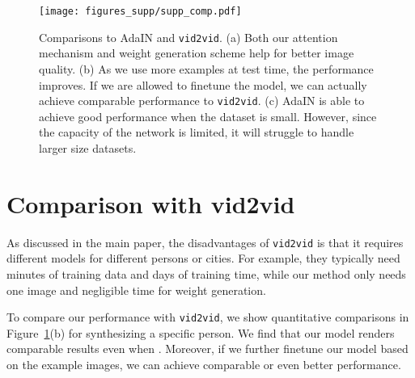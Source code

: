 \documentclass{article}
\newcommand{\vidtovid}{{\texttt{vid2vid}}\xspace}
\begin{document}
\begin{figure}
  \begin{center}
    \texttt{[image: figures\_supp/supp\_comp.pdf]}
    \vspace{-2mm}
  \end{center}
  \caption{Comparisons to AdaIN and \vidtovid. (a) Both our attention mechanism and weight generation scheme help for better image quality. (b) As we use more examples at test time, the performance improves. If we are allowed to finetune the model, we can actually achieve comparable performance to \vidtovid. (c) AdaIN is able to achieve good performance when the dataset is small. However, since the capacity of the network is limited, it will struggle to handle larger size datasets.}
  \vspace{-4mm}
  \label{fig:supp_comp}
\end{figure}

\section{Comparison with vid2vid}
As discussed in the main paper, the disadvantages of \vidtovid is that it requires different models for different persons or cities. For example, they typically need minutes of training data and days of training time, while our method only needs one image and negligible time for weight generation.

To compare our performance with \vidtovid, we show quantitative comparisons in Figure~\ref{fig:supp_comp}(b) for synthesizing a specific person. We find that our model renders comparable results even when . Moreover, if we further finetune our model based on the example images, we can achieve comparable or even better performance.
 \fi
\end{document}
